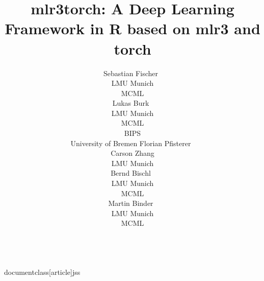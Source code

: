 \\documentclass[article]{jss}
\author{Sebastian Fischer~\orcidlink{0000-0002-9609-3197} \\
    LMU Munich \\
    MCML \\
    \And Lukas Burk~\orcidlink{0000-0001-7528-3795} \\
    LMU Munich \\
    MCML\\
    BIPS \\
    University of Bremen
    \And Florian Pfisterer~\orcidlink{0000-0001-8867-762X} \\
    \AND Carson Zhang \\
    LMU Munich \\
    \And Bernd Bischl~\orcidlink{0000-0001-6002-6980} \\
    LMU Munich \\
    MCML \\
    \And Martin Binder~\orcidlink{0009-0008-2578-2869} \\
    LMU Munich \\
    MCML \\
}
\title{mlr3torch: A Deep Learning Framework in R based on mlr3 and torch}
\theoremstyle{definition}
\begin{document}
\begin{comment}

Fullfilled:

\begin{itemize}
    \item Code distributed with JSS articles uses the GNU General Public License (GPL) version 2 or version 3 or a GPL-compatible license. JSS does NOT consider software distributed under other licenses.
\end{itemize}

Final submission:

\begin{itemize}
    \item [ ] Size limit: Upload not more than 50 MB
    \item [ ] submission must contain: pdf manuscript, source code, replication materials
    \item [ ] the manuscript must be fully and exactly reproducible on at least one platform
    \item [ ] We need to provide a simplified version of the script reproducing the results that can run on a regular PC. (https://www.jstatsoft.org/authors#manuscript-preparation) -> maybe I can just run this on GitHub actions CI?
    \item [ ] to facilitate review, authors are strongly encouraged to provide an output file that shows the results from running the single standalone replication script so that this can be compared against the results presented in the manuscript. For R submissions, this should be done by providing a file “code.html” created by running knitr::spin(“code.R”) on the replication script “code.R” which should include a call to sessionInfo() at the end.
    \item [ ] Source code must be submitted in ASCII files (but need to read software preparation guidelines again after submission: https://www.jstatsoft.org/authors#manuscript-preparation)
    \item [ ] manuscript can be compiled using pdflatex
    \item [ ] Special naming for programming languages and journals (don't think it applies here)
\end{itemize}

JSS Guides:

\begin{itemize}
    \item Should read https://stats-devguide.ropensci.org/ (more as general guidance, not a requirement for packages reviewed by JSS)
    \item !!!discuss the advantages and disadvantages of the new contribution compared to existing implementations, when possible and also applicable using empirical illustrations.
    \item Page limit: not longer than 30 pages
\end{itemize}


\end{comment}
\end{document}
